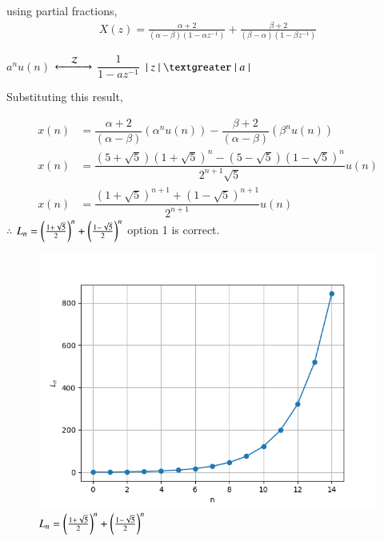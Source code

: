 \documentclass[journal,12pt,twocolumn]{IEEEtran}
\theoremstyle{remark}
\begin{document}
	\vspace{0.4cm}
 using partial fractions,
 \begin{align}
     X(z)=\frac{\alpha+2}{(\alpha-\beta)(1-\alpha z^{-1})}+\frac{\beta+2}{(\beta-\alpha)(1-\beta z^{-1})}
 \end{align}
 
	$a^n u(n)$
	$\xleftarrow[]{\hspace{0.4cm}{\mathcal{Z}}\hspace{0.1cm}}\xrightarrow[]{}$
	$\dfrac{1}{1 - a z^{-1}}$ \hspace{0.2cm} $\lvert \hspace{0.1cm} z \hspace{0.1cm}\rvert \hspace{0.1cm} \textgreater \hspace{0.1cm} \lvert \hspace{0.1cm} a \hspace{0.1cm} \rvert$
	
	\vspace{0.4cm}
	
	Substituting this result,
	
	\vspace{-0.5cm}
	
	\begin{align}
		x(n) &= \dfrac{\alpha+2}{(\alpha - \beta)} (\alpha^n u(n)) - \dfrac{\beta+2}{(\alpha - \beta)} (\beta^n u(n))\\
	    x(n) &= \dfrac{(5+\sqrt{5})(1 + \sqrt{5})^{n} - (5-\sqrt{5})(1 - \sqrt{5})^{n} }{2^{n+1} \sqrt{5}} u(n)\\
    	x(n) &= \dfrac{(1 + \sqrt{5})^{n+1} +(1 - \sqrt{5})^{n+1} }{2^{n+1}} u(n)
    \end{align}
$\therefore$ $L_{n} =\left(\frac{1+\sqrt{5}}{2}\right)^n+\left(\frac{1-\sqrt{5}}{2}\right)^n$
option 1 is correct.
\newpage
\begin{figure}[h]
  \centering
  \includegraphics[width=\columnwidth]{figs/fig1.png}
  \caption{$L_{n}=\left(\frac{1+\sqrt{5}}{2}\right)^n+\left(\frac{1-\sqrt{5}}{2}\right)^n$}
  \label{fig:graph}
\end{figure}
\end{document}
